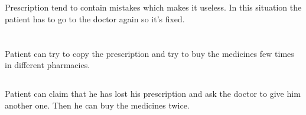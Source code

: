 \subsection{}
Prescription tend to contain mistakes which makes it useless. In this situation the patient has to go to the doctor again so it's fixed.

\section{}

\subsection{}
Patient can try to copy the prescription and try to buy the medicines
few times in different pharmacies.

\subsection{}
Patient can claim that he has lost his prescription and ask the
doctor to give him another one. Then he can buy the medicines twice.
